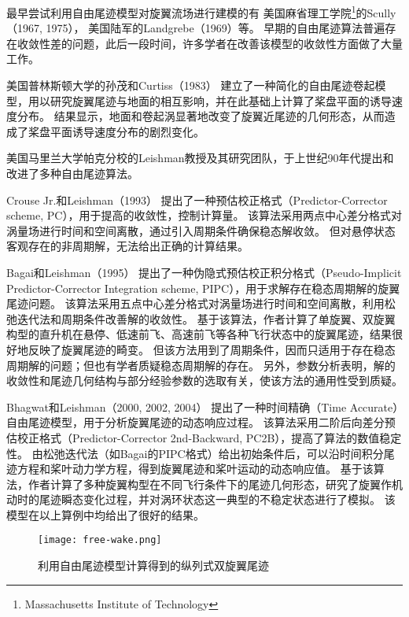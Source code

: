 最早尝试利用自由尾迹模型对旋翼流场进行建模的有
美国麻省理工学院\footnote{Massachusetts Institute of Technology}的Scully（1967, 1975），
美国陆军的Landgrebe（1969）等。
早期的自由尾迹算法普遍存在收敛性差的问题，此后一段时间，许多学者在改善该模型的收敛性方面做了大量工作。

美国普林斯顿大学的孙茂和Curtiss（1983）
建立了一种简化的自由尾迹卷起模型，用以研究旋翼尾迹与地面的相互影响，并在此基础上计算了桨盘平面的诱导速度分布。
结果显示，地面和卷起涡显著地改变了旋翼近尾迹的几何形态，从而造成了桨盘平面诱导速度分布的剧烈变化。

美国马里兰大学帕克分校的Leishman教授及其研究团队，于上世纪90年代提出和改进了多种自由尾迹算法。

Crouse Jr.和Leishman（1993）
提出了一种预估校正格式（Predictor-Corrector scheme, PC），用于提高的收敛性，控制计算量。
该算法采用两点中心差分格式对涡量场进行时间和空间离散，通过引入周期条件确保稳态解收敛。
但对悬停状态客观存在的非周期解，无法给出正确的计算结果。

Bagai和Leishman（1995）
提出了一种伪隐式预估校正积分格式（Pseudo-Implicit Predictor-Corrector Integration scheme, PIPC），用于求解存在稳态周期解的旋翼尾迹问题。
该算法采用五点中心差分格式对涡量场进行时间和空间离散，利用松弛迭代法和周期条件改善解的收敛性。
基于该算法，作者计算了单旋翼、双旋翼构型的直升机在悬停、低速前飞、高速前飞等各种飞行状态中的旋翼尾迹，结果很好地反映了旋翼尾迹的畸变。
但该方法用到了周期条件，因而只适用于存在稳态周期解的问题；但也有学者质疑稳态周期解的存在。
另外，参数分析表明，解的收敛性和尾迹几何结构与部分经验参数的选取有关，使该方法的通用性受到质疑。

Bhagwat和Leishman（2000, 2002, 2004）
提出了一种时间精确（Time Accurate）自由尾迹模型，用于分析旋翼尾迹的动态响应过程。
该算法采用二阶后向差分预估校正格式（Predictor-Corrector 2nd-Backward, PC2B），提高了算法的数值稳定性。
由松弛迭代法（如Bagai的PIPC格式）给出初始条件后，可以沿时间积分尾迹方程和桨叶动力学方程，得到旋翼尾迹和桨叶运动的动态响应值。
基于该算法，作者计算了多种旋翼构型在不同飞行条件下的尾迹几何形态，研究了旋翼作机动时的尾迹瞬态变化过程，并对涡环状态这一典型的不稳定状态进行了模拟。
该模型在以上算例中均给出了很好的结果。
\begin{figure}[t!]
    \centering
    \texttt{[image: free-wake.png]}
    \caption{利用自由尾迹模型计算得到的纵列式双旋翼尾迹}\label{free-wake}
\end{figure}

